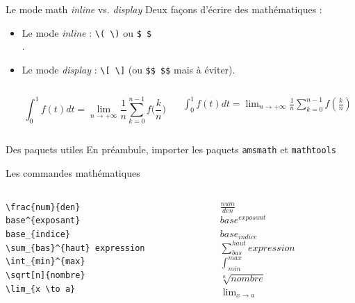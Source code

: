 \documentclass[handout]{beamer}
\begin{document}
\begin{frame}{Le mode math \textit{inline} vs. \textit{display}}
Deux façons d'écrire des mathématiques :\\[11pt]
\begin{itemize}
	\item Le mode \textit{inline} : \texttt{\textbackslash ( \textbackslash)} ou \texttt{\$ \$}\\[11pt].
	\item Le mode \textit{display} : \texttt{\textbackslash [ \textbackslash]} (ou \texttt{\$\$  \$\$} mais à éviter).
	\begin{columns}
		\begin{column}{0.4\textwidth}
			\[ \int_{0}^{1} f(t)dt = \lim_{n \to +\infty} \frac{1}{n}\sum_{k=0}^{n-1}f\bigg(\frac{k}{n}\bigg)\]
		\end{column}
	\hspace{1cm}
		\begin{column}{0.6\textwidth}
			\( \int_{0}^{1} f(t)dt = \lim_{n \to +\infty} \frac{1}{n}\sum_{k=0}^{n-1}f(\frac{k}{n}) \)
		\end{column}
	\end{columns}
\end{itemize}
\end{frame}
\begin{frame}{Des paquets utiles}
En préambule, importer les paquets \texttt{amsmath} et \texttt{mathtools}
\end{frame}
\begin{frame}[fragile]{Les commandes mathématiques}
\begin{columns}
	\begin{column}{0.5\textwidth}
		\verb|\frac{num}{den}|\\[11pt]
		\verb|base^{exposant}|\\[11pt]
		\verb|base_{indice}|\\[11pt]
		\verb|\sum_{bas}^{haut} expression|\\[11pt]
		\verb|\int_{min}^{max}|\\[11pt]
		\verb|\sqrt[n]{nombre}|\\[11pt]
		\verb|\lim_{x \to a}|
	\end{column}
\hspace{0.5cm}
	\begin{column}{0.5\textwidth}
		$\frac{num}{den}$\\[11pt]
		$base^{exposant}$\\[11pt]
		$base_{indice}$\\[11pt]
		$\sum_{bas}^{haut} expression$\\[11pt]
		$\int_{min}^{max}$\\[11pt]
		$\sqrt[n]{nombre}$\\[11pt]
		$\lim_{x \to a}$
	\end{column}
\end{columns}
\end{frame}
\end{document}
